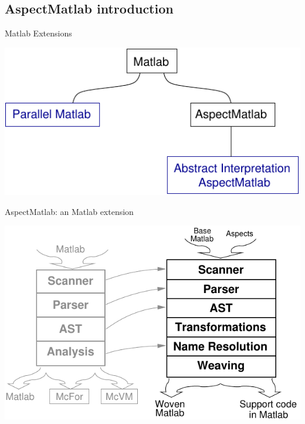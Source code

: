
\subsection*{AspectMatlab introduction}

\begin{frame}{Matlab Extensions}
  \begin{center}
    \includegraphics{images/extensions.pdf}
  \end{center}
\end{frame}
\begin{frame}{AspectMatlab: an Matlab extension}
  \begin{center}
    \includegraphics[scale=0.9]{images/mclab_aspect_aspect.pdf}
  \end{center}

\end{frame}

